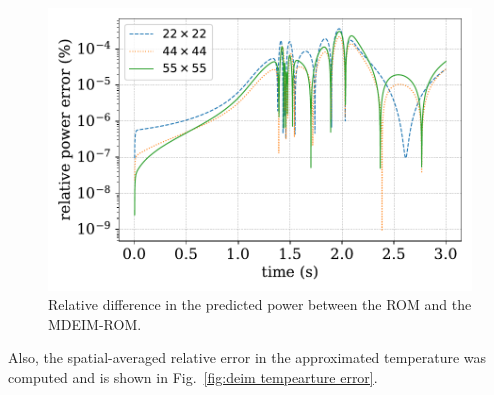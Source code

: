 \documentclass[]{interact}
\theoremstyle{plain}%
\theoremstyle{definition}
\theoremstyle{remark}
\begin{document}
\begin{figure}[H]
	\centering
	\includegraphics[width=1.0\linewidth]{../figures/LRA_mdeim_relative_error.pdf}
	\caption{Relative difference in the predicted power between the ROM and the MDEIM-ROM.}
	\label{fig:rom-deim power error}
\end{figure}
Also, the spatial-averaged relative error in the approximated temperature was computed and is shown in Fig.~\ref{fig:deim tempearture error}.
\end{document}
